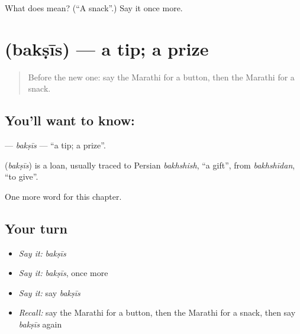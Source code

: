 \begin{tcolorbox}[breakable,colback=teal!4,colframe=teal!35!black,title={Before you move on}]
What does  mean? (\textquotedblleft{}A snack\textquotedblright{}.) Say it once more.
\end{tcolorbox}
\section[\texorpdfstring{\mr{बक्षीस} (bakṣīs)}{बक्षीस (bakṣīs)}]{ (bakṣīs) — a tip; a prize}

\label{lesson:MR-C208-baksis}



\begin{quote}
Before the new one: say the Marathi for a button, then the Marathi for a snack.
\end{quote}

\subsection*{You'll want to know: }
\textbf{} — \emph{bakṣīs} — \textquotedblleft{}a tip; a prize\textquotedblright{}.

\begin{cousinweb}
\textbf{} (\emph{bakṣīs}) is a loan, usually traced to Persian \emph{bakhshish}, \textquotedblleft{}a gift\textquotedblright{}, from \emph{bakhshīdan}, \textquotedblleft{}to give\textquotedblright{}.
\end{cousinweb}

\begin{grammarlens}[title={What you've built}]
One more word for this chapter.
\end{grammarlens}

\subsection*{Your turn}
\begin{itemize}
\raggedright
  \item \emph{Say it:} \emph{bakṣīs}
  \item \emph{Say it:} \emph{bakṣīs}, once more
  \item \emph{Say it:} say \emph{bakṣīs}
  \item \emph{Recall:} say the Marathi for a button, then the Marathi for a snack, then say \emph{bakṣīs} again
\end{itemize}

